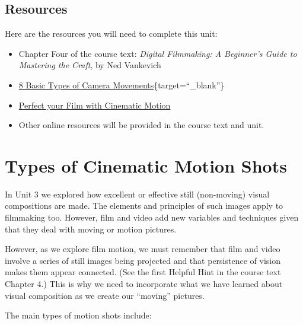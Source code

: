 \documentclass[
]{book}
\providecommand{\tightlist}{%
  \setlength{\itemsep}{0pt}\setlength{\parskip}{0pt}}
\begin{document}
\hypertarget{resources-3}{%
\subsection*{Resources}\label{resources-3}}

Here are the resources you will need to complete this unit:

\begin{itemize}
\tightlist
\item
  Chapter Four of the course text: \emph{Digital Filmmaking: A Beginner's Guide to Mastering the Craft}, by Ned Vankevich
\item
  \href{https://www.youtube.com/watch?v=g6zMtnLC50w}{8 Basic Types of Camera Movements}\{target=``\_blank''\}
\item
  \href{https://www.youtube.com/watch?v=VPfKsdPsS5w}{Perfect your Film with Cinematic Motion}
\item
  Other online resources will be provided in the course text and unit.
\end{itemize}

\hypertarget{types-of-cinematic-motion-shots}{%
\section*{Types of Cinematic Motion Shots}\label{types-of-cinematic-motion-shots}}

In Unit 3 we explored how excellent or effective still (non-moving) visual compositions are made. The elements and principles of such images apply to filmmaking too. However, film and video add new variables and techniques given that they deal with moving or motion pictures.

However, as we explore film motion, we must remember that film and video involve a series of still images being projected and that persistence of vision makes them appear connected. (See the first Helpful Hint in the course text Chapter 4.) This is why we need to incorporate what we have learned about visual composition as we create our ``moving'' pictures.

The main types of motion shots include:
\end{document}
